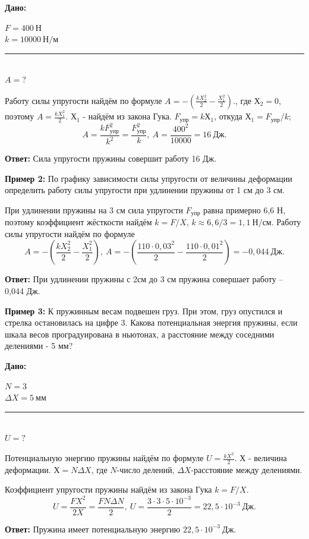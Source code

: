 \documentclass[a5paper, 10pt]{diss_4}
\renewcommand{\'}{\,'}
\begin{document}
\hspace{1cm}\textbf{Дано:}\hspace{.3cm}
\parbox[t]{4cm}{
$F= 400\ Н$\\
$k=10000\ Н/м$\\
\rule{4cm}{.4pt}\\
$A = ?$\\
}


Работу силы упругости найдём по формуле $A=-(\frac{kX_2^2}{2}-\frac{X_1^2}{2}).$, где $Х_2=0$, поэтому $A=\frac{kX_1^2}{2}$.
$Х_1$ - найдём из закона Гука. $F_{упр}=kХ_1$, откуда $Х_1=F_{упр}/k$;
\[
A=\frac{kF_{упр}^2}{k^2}=\frac{F_{упр}^2}{k},\
A=\frac{400^2}{10000}=16\ Дж.
\]

\textbf{Ответ:} Сила упругости пружины совершит работу 16 Дж.


\textbf{Пример 2:} По графику зависимости силы упругости от величины деформации определить работу силы упругости при удлинении пружины от 1 см до 3 см.

При удлинении пружины на 3 см сила упругости $F_{упр}$ равна примерно 6,6 Н, поэтому коэффициент жёсткости найдём $k=F/X$,
$k\approx6,6/3=1,1\ Н/см$. Работу силы упругости найдём по формуле
\[
A=-(\frac{kX_2^2}{2}-\frac{X_1^2}{2}),\ A=-(\frac{110\cdot0,03^2}{2}-\frac{110\cdot0,01^2}{2})= -0,044\ Дж.
\]

\textbf{Ответ:} При удлинении пружины с 2см до 3 см пружина совершает работу -- 0,044 Дж.

\textbf{Пример 3:} К пружинным весам подвешен груз. При этом, груз опустился и стрелка остановилась на цифре 3. Какова потенциальная энергия пружины, если шкала весов проградуирована в ньютонах, а расстояние между соседними делениями - 5 мм?

\hspace{1cm}\textbf{Дано:}\hspace{.3cm}
\parbox[t]{4cm}{
$N= 3$\\
$\Delta X=5\ мм$\\
\rule{4cm}{.4pt}\\
$U = ?$\\
}

Потенциальную энергию пружины найдём по формуле $U=\frac{kX^2}{2}$. $Х$ - величина деформации. $Х =N\Delta X$,
где $N$-число делений, $\Delta X$-расстояние между делениями.

Коэффициент упругости пружины найдём из закона Гука $k=F/X$.
\[
U=\frac{FX^2}{2X}=\frac{FN\Delta N}{2},\
U=\frac{3\cdot3\cdot5\cdot10^{-3}}{2}=22,5\cdot10^{-3}\ Дж.
\]

\textbf{Ответ:} Пружина имеет потенциальную энергию $22,5\cdot10^{-3}\ Дж$.
\end{document}
